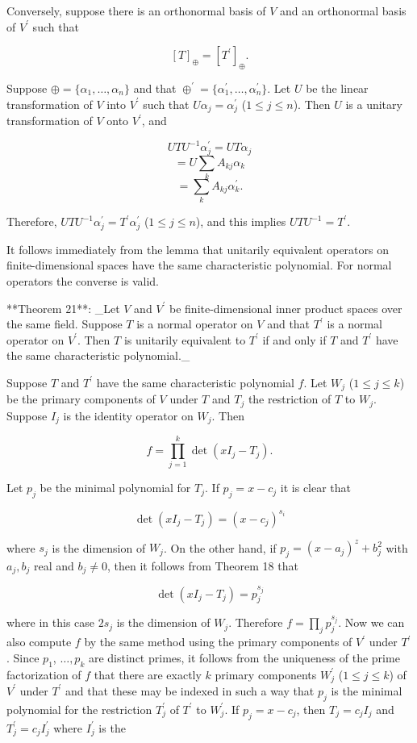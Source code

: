Conversely, suppose there is an orthonormal basis of \(V\) and an orthonormal basis of \(V^{\prime}\) such that

\[[T]_{\oplus}=[T^{\prime}]_{\oplus}.\]

Suppose \(\oplus=\{\alpha_{1},\ldots,\alpha_{n}\}\) and that \(\oplus^{\prime}=\{\alpha_{1}^{\prime},\ldots,\alpha_{n}^{\prime}\}.\) Let \(U\) be the linear transformation of \(V\) into \(V^{\prime}\) such that \(U\alpha_{j}=\alpha_{j}^{\prime}\) (\(1\leq j\leq n\)). Then \(U\) is a unitary transformation of \(V\) onto \(V^{\prime}\), and

\[UTU^{-1}\alpha_{j}^{\prime} = UT\alpha_{j}\] \[= U\sum_{k}A_{kj}\alpha_{k}\] \[= \sum_{k}A_{kj}\alpha_{k}^{\prime}.\]

Therefore, \(UTU^{-1}\alpha_{j}^{\prime}=T^{\prime}\alpha_{j}^{\prime}\) (\(1\leq j\leq n\)), and this implies \(UTU^{-1}=T^{\prime}\).

It follows immediately from the lemma that unitarily equivalent operators on finite-dimensional spaces have the same characteristic polynomial. For normal operators the converse is valid.

**Theorem 21**: _Let \(V\) and \(V^{\prime}\) be finite-dimensional inner product spaces over the same field. Suppose \(T\) is a normal operator on \(V\) and that \(T^{\prime}\) is a normal operator on \(V^{\prime}\). Then \(T\) is unitarily equivalent to \(T^{\prime}\) if and only if \(T\) and \(T^{\prime}\) have the same characteristic polynomial._

Suppose \(T\) and \(T^{\prime}\) have the same characteristic polynomial \(f\). Let \(W_{j}\) (\(1\leq j\leq k\)) be the primary components of \(V\) under \(T\) and \(T_{j}\) the restriction of \(T\) to \(W_{j}\). Suppose \(I_{j}\) is the identity operator on \(W_{j}\). Then

\[f=\prod_{j=1}^{k}\det(xI_{j}-T_{j}).\]

Let \(p_{j}\) be the minimal polynomial for \(T_{j}\). If \(p_{j}=x-c_{j}\) it is clear that

\[\det(xI_{j}-T_{j})=(x-c_{j})^{s_{i}}\]

where \(s_{j}\) is the dimension of \(W_{j}\). On the other hand, if \(p_{j}=(x-a_{j})^{z}+b_{j}^{2}\) with \(a_{j},b_{j}\) real and \(b_{j}\neq 0\), then it follows from Theorem 18 that

\[\det(xI_{j}-T_{j})=p_{j}^{s_{j}}\]

where in this case \(2s_{j}\) is the dimension of \(W_{j}\). Therefore \(f=\prod_{j}p_{j}^{s_{j}}\). Now we can also compute \(f\) by the same method using the primary components of \(V^{\prime}\) under \(T^{\prime}\). Since \(p_{1}\), \(\ldots,p_{k}\) are distinct primes, it follows from the uniqueness of the prime factorization of \(f\) that there are exactly \(k\) primary components \(W_{j}^{\prime}\) (\(1\leq j\leq k\)) of \(V^{\prime}\) under \(T^{\prime}\) and that these may be indexed in such a way that \(p_{j}\) is the minimal polynomial for the restriction \(T_{j}^{\prime}\) of \(T^{\prime}\) to \(W_{j}^{\prime}\). If \(p_{j}=x-c_{j}\), then \(T_{j}=c_{j}I_{j}\) and \(T_{j}^{\prime}=c_{j}I_{j}^{\prime}\) where \(I_{j}^{\prime}\) is the 